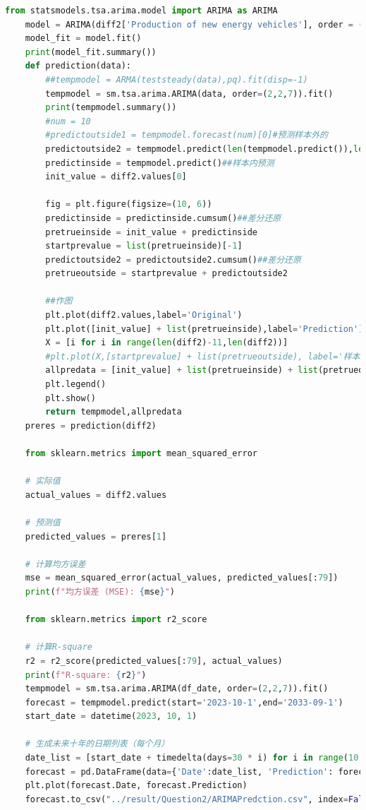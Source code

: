 \documentclass{apmcmthesis}
\begin{document}
\begin{lstlisting}[language=Python,caption={The Python Source code of Algorithm}]
    from statsmodels.tsa.arima.model import ARIMA as ARIMA
    model = ARIMA(diff2['Production of new energy vehicles'], order = (10,2,7))
    model_fit = model.fit()
    print(model_fit.summary())
    def prediction(data):
        ##tempmodel = ARMA(teststeady(data),pq).fit(disp=-1)
        tempmodel = sm.tsa.arima.ARIMA(data, order=(2,2,7)).fit()
        print(tempmodel.summary())
        #num = 10
        #predictoutside1 = tempmodel.forecast(num)[0]#预测样本外的
        predictoutside2 = tempmodel.predict(len(tempmodel.predict()),len(tempmodel.predict()) + 9,dynamic=True)##也是样本外预测，预测结果一致
        predictinside = tempmodel.predict()##样本内预测
        init_value = diff2.values[0]
    
        fig = plt.figure(figsize=(10, 6))
        predictinside = predictinside.cumsum()##差分还原
        pretrueinside = init_value + predictinside
        startprevalue = list(pretrueinside)[-1]
        predictoutside2 = predictoutside2.cumsum()##差分还原
        pretrueoutside = startprevalue + predictoutside2
        
        ##作图
        plt.plot(diff2.values,label='Original')
        plt.plot([init_value] + list(pretrueinside),label='Prediction')
        X = [i for i in range(len(diff2)-11,len(diff2))]
        #plt.plot(X,[startprevalue] + list(pretrueoutside), label='样本外预测值')
        allpredata = [init_value] + list(pretrueinside) + list(pretrueoutside)
        plt.legend()
        plt.show()
        return tempmodel,allpredata
    preres = prediction(diff2)
    
    from sklearn.metrics import mean_squared_error
    
    # 实际值
    actual_values = diff2.values
    
    # 预测值
    predicted_values = preres[1]
    
    # 计算均方误差
    mse = mean_squared_error(actual_values, predicted_values[:79])
    print(f"均方误差 (MSE): {mse}")
    
    from sklearn.metrics import r2_score
    
    # 计算R-square
    r2 = r2_score(predicted_values[:79], actual_values)
    print(f"R-square: {r2}")
    tempmodel = sm.tsa.arima.ARIMA(df_date, order=(2,2,7)).fit()
    forecast = tempmodel.predict(start='2023-10-1',end='2033-09-1')
    start_date = datetime(2023, 10, 1)
    
    # 生成未来十年的日期列表（每个月）
    date_list = [start_date + timedelta(days=30 * i) for i in range(10 * 12)]
    forecast = pd.DataFrame(data={'Date':date_list, 'Prediction': forecast})
    plt.plot(forecast.Date, forecast.Prediction)
    forecast.to_csv("../result/Question2/ARIMAPredction.csv", index=False)

\end{lstlisting}
\end{document}
